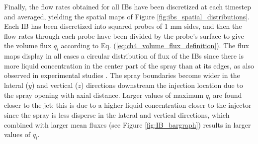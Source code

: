 Finally, the flow rates obtained for all IBs have been discretized at each timestep and averaged, yielding the spatial maps of Figure \ref{fig:ibs_spatial_distributions}. Each IB has been discretized into squared probes of 1 mm sides, and then the flow rates through each probe have been divided by the probe's surface to give the volume flux $q_l$ according to Eq. (\ref{eq:ch4_volume_flux_definition}). The flux maps display in all cases a circular distribution of flux of the IBs since there is more liquid concentration in the center part of the spray than at its edges, as also observed in experimental studies .  The spray boundaries become wider in the lateral ($y$) and vertical ($z$) directions downstream the injection location due to the spray opening with axial distance. Larger values of maximum $q_l$ are found closer to the jet: this is due to a higher liquid concentration closer to the injector since the spray is less disperse in the lateral and vertical directions, which combined with larger mean fluxes (see Figure \ref{fig:IB_bargraph}) results in larger values of $q_l$. 



\clearpage


